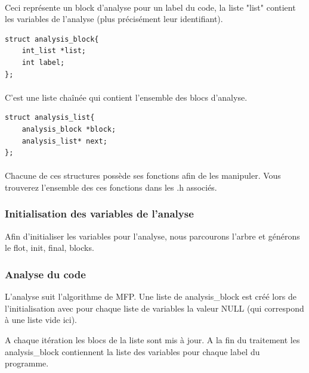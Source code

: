 \documentclass[12pt,a4paper,oneside]{article}
\begin{document}
\paragraph{}
Ceci représente un block d'analyse pour un label du code, la liste "list" contient les variables de l'analyse (plus précisément leur identifiant).
\begin{lstlisting}
struct analysis_block{
	int_list *list;
	int label;
};
\end{lstlisting}

\paragraph{}
C'est une liste chaînée qui contient l'ensemble des blocs d'analyse.
\begin{lstlisting}
struct analysis_list{
	analysis_block *block;
	analysis_list* next;
};
\end{lstlisting}

\paragraph{}
Chacune de ces structures possède ses fonctions afin de les manipuler.
Vous trouverez l'ensemble des ces fonctions dans les .h associés.

\subsubsection{Initialisation des variables de l'analyse}
Afin d'initialiser les variables pour l'analyse, nous parcourons l'arbre et générons le flot, init, final, blocks.

\subsubsection{Analyse du code}
L'analyse suit l'algorithme de MFP. Une liste de analysis\_block est créé lors de l'initialisation avec pour chaque liste de variables la valeur NULL (qui correspond à une liste vide ici).

A chaque itération les blocs de la liste sont mis à jour. A la fin du traitement les analysis\_block contiennent la liste des variables pour chaque label du programme.

\newpage
\end{document}
